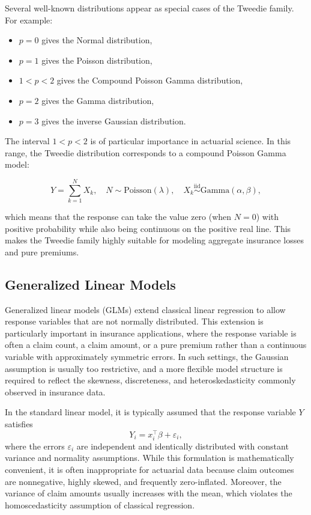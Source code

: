 \documentclass{sfuthesis}
\numberwithin{equation}{chapter}
\begin{document}
Several well-known distributions appear as special cases of the Tweedie family. For example:
\begin{itemize}
    \item $p=0$ gives the Normal distribution,
    \item $p=1$ gives the Poisson distribution,
    \item $1<p<2$ gives the Compound Poisson Gamma distribution,
    \item $p=2$ gives the Gamma distribution,
    \item $p=3$ gives the inverse Gaussian distribution.
\end{itemize}

The interval $1 < p < 2$ is of particular importance in actuarial science. In this range, the Tweedie distribution corresponds to a compound Poisson Gamma model:

\begin{equation}
    Y = \sum_{k=1}^N X_k, \quad N \sim \mathrm{Poisson}(\lambda), \quad X_k \stackrel{\mathrm{iid}}{\sim} \mathrm{Gamma}(\alpha,\beta),
    \label{eq:compound_poisson}
\end{equation}

\noindent which means that the response can take the value zero (when $N=0$) with positive probability while also being continuous on the positive real line. This makes the Tweedie family highly suitable for modeling aggregate insurance losses and pure premiums.


\subsection{Generalized Linear Models}

Generalized linear models (GLMs) extend classical linear regression to allow response variables that are not normally distributed. This extension is particularly important in insurance applications, where the response variable is often a claim count, a claim amount, or a pure premium rather than a continuous variable with approximately symmetric errors. In such settings, the Gaussian assumption is usually too restrictive, and a more flexible model structure is required to reflect the skewness, discreteness, and heteroskedasticity commonly observed in insurance data.

In the standard linear model, it is typically assumed that the response variable $Y$ satisfies
\begin{equation}
    Y_i = x_i^\top \beta + \varepsilon_i,
\end{equation}
where the errors $\varepsilon_i$ are independent and identically distributed with constant variance and normality assumptions. While this formulation is mathematically convenient, it is often inappropriate for actuarial data because claim outcomes are nonnegative, highly skewed, and frequently zero-inflated. Moreover, the variance of claim amounts usually increases with the mean, which violates the homoscedasticity assumption of classical regression. 
\end{document}
